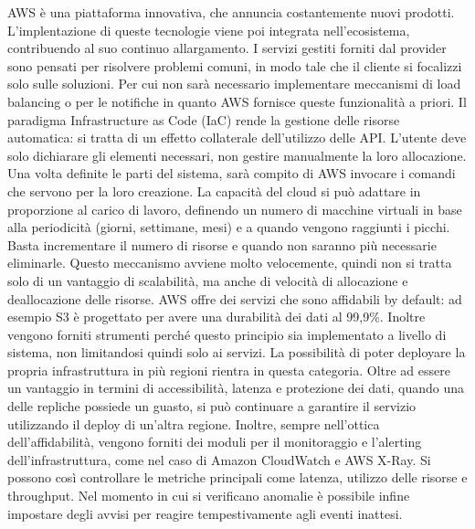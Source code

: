 AWS è una piattaforma innovativa, che annuncia costantemente nuovi prodotti. L'implentazione di queste tecnologie viene poi integrata nell'ecosistema, contribuendo al suo continuo allargamento. %
I servizi gestiti forniti dal provider sono pensati per risolvere problemi comuni, in modo tale che il cliente si focalizzi solo sulle soluzioni. Per cui non sarà necessario implementare meccanismi di load balancing o per le notifiche in quanto AWS fornisce queste funzionalità a priori. %
Il paradigma Infrastructure as Code (IaC) rende la gestione delle risorse automatica: si tratta di un effetto collaterale dell'utilizzo delle API. L'utente deve solo dichiarare gli elementi necessari, non gestire manualmente la loro allocazione. Una volta definite le parti del sistema, sarà compito di AWS invocare i comandi che servono per la loro creazione. %
La capacità del cloud si può adattare in proporzione al carico di lavoro, definendo un numero di macchine virtuali in base alla periodicità (giorni, settimane, mesi) e a quando vengono raggiunti i picchi. Basta incrementare il numero di risorse e quando non saranno più necessarie eliminarle. Questo meccanismo avviene molto velocemente, quindi non si tratta solo di un vantaggio di scalabilità, ma anche di velocità di allocazione e deallocazione delle risorse. %
AWS offre dei servizi che sono affidabili by default: ad esempio S3 è progettato per avere una durabilità dei dati al 99,9\%. Inoltre vengono forniti strumenti perché questo principio sia implementato a livello di sistema, non limitandosi quindi solo ai servizi. La possibilità di poter deployare la propria infrastruttura in più regioni rientra in questa categoria. Oltre ad essere un vantaggio in termini di accessibilità, latenza e protezione dei dati, quando una delle repliche possiede un guasto, si può continuare a garantire il servizio utilizzando il deploy di un'altra regione. Inoltre, sempre nell'ottica dell'affidabilità, vengono forniti dei moduli per il monitoraggio e l'alerting dell'infrastruttura, come nel caso di Amazon CloudWatch e AWS X-Ray. Si possono così controllare le metriche principali come latenza, utilizzo delle risorse e throughput. Nel momento in cui si verificano anomalie è possibile infine impostare degli avvisi per reagire tempestivamente agli eventi inattesi. 

